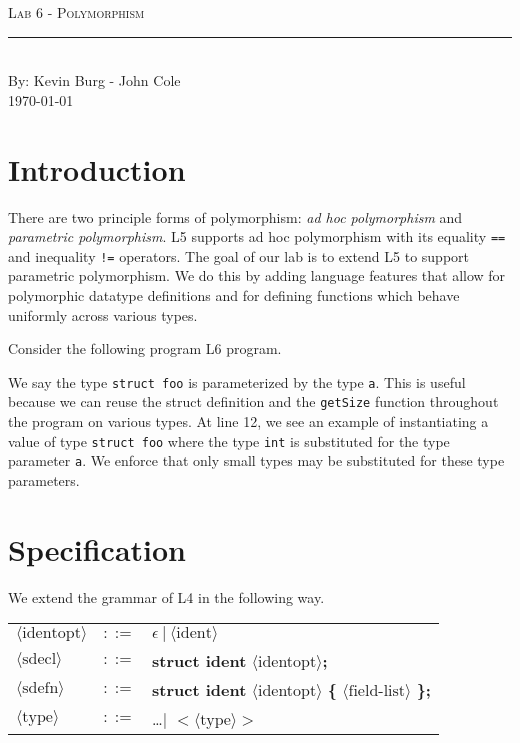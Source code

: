 \documentclass[aps,letterpaper,11pt]{revtex4}
\newcommand{\labtitle}{Lab 6 - Polymorphism}
\newcommand{\authorname}{Kevin Burg - John Cole}
\begin{document}
\begin{titlepage}
\begin{center}
{\Large \textsc{\labtitle} \\ \vspace{4pt}} 
\rule[13pt]{\textwidth}{1pt} \\ \vspace{150pt}
{\large By: \authorname \\ \vspace{10pt}
\today}
\end{center}
\end{titlepage}


\section{Introduction}
There are two principle forms of polymorphism: \emph{ad hoc polymorphism} and \emph{parametric polymorphism}.
L5 supports ad hoc polymorphism with its equality \texttt{==} and inequality \texttt{!=} operators. The goal
of our lab is to extend L5 to support parametric polymorphism. We do this by adding language features that
allow for polymorphic datatype definitions and for defining functions which behave uniformly across various
types.

Consider the following program L6 program.



We say the type \texttt{struct foo} is parameterized by the type \texttt{a}. This is useful because we can 
reuse the struct definition and the \texttt{getSize} function throughout the program on various types.
At line 12, we see an example of instantiating a value of type \texttt{struct foo} where the type
\texttt{int} is substituted for the type parameter \texttt{a}. We enforce that only small types may be
substituted for these type parameters.


\newpage
\section{Specification}

We extend the grammar of L4 in the following way.\\

\begin{tabular}{lll}
$\langle\text{identopt}\rangle$ \hspace{.5in}	& $::=$ & $\epsilon~|~\langle\text{ident}\rangle$\\
$\langle\text{sdecl}\rangle$	& $::=$	& 	\textbf{struct ident} $\langle$identopt$\rangle$\textbf{;}\\
$\langle\text{sdefn}\rangle$	& $::=$	& 	\textbf{struct ident} $\langle$identopt$\rangle$ \textbf{\{}
											$\langle\text{field-list}\rangle$ \textbf{\};}\\
$\langle\text{type}\rangle$	& $::=$	& \ldots $|$ \textbf{$<$}$\langle\text{type}\rangle$\textbf{$>$}
\end{tabular}\\
\end{document}
